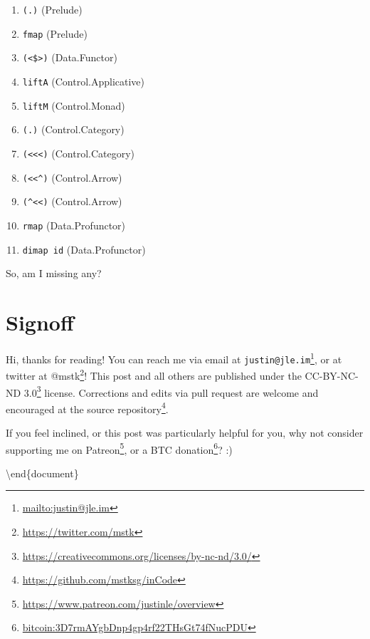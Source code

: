 \documentclass[]{article}
\renewcommand{\href}[2]{#2\footnote{\url{#1}}}
\begin{document}
\begin{enumerate}
\def\labelenumi{\arabic{enumi}.}
\tightlist
\item
  \texttt{(.)} (Prelude)
\item
  \texttt{fmap} (Prelude)
\item
  \texttt{(\textless{}\$\textgreater{})} (Data.Functor)
\item
  \texttt{liftA} (Control.Applicative)
\item
  \texttt{liftM} (Control.Monad)
\item
  \texttt{(.)} (Control.Category)
\item
  \texttt{(\textless{}\textless{}\textless{})} (Control.Category)
\item
  \texttt{(\textless{}\textless{}\^{})} (Control.Arrow)
\item
  \texttt{(\^{}\textless{}\textless{})} (Control.Arrow)
\item
  \texttt{rmap} (Data.Profunctor)
\item
  \texttt{dimap\ id} (Data.Profunctor)
\end{enumerate}

So, am I missing any?

\section{Signoff}\label{signoff}

Hi, thanks for reading! You can reach me via email at
\href{mailto:justin@jle.im}{\nolinkurl{justin@jle.im}}, or at twitter at
\href{https://twitter.com/mstk}{@mstk}! This post and all others are published
under the \href{https://creativecommons.org/licenses/by-nc-nd/3.0/}{CC-BY-NC-ND
3.0} license. Corrections and edits via pull request are welcome and encouraged
at \href{https://github.com/mstksg/inCode}{the source repository}.

If you feel inclined, or this post was particularly helpful for you, why not
consider \href{https://www.patreon.com/justinle/overview}{supporting me on
Patreon}, or a \href{bitcoin:3D7rmAYgbDnp4gp4rf22THsGt74fNucPDU}{BTC donation}?
:)

\textbackslash end\{document\}
\end{document}
